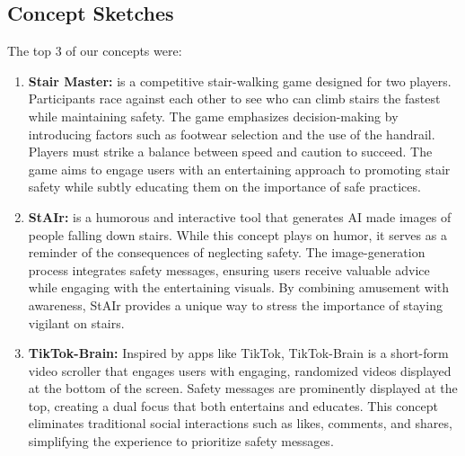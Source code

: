 \documentclass{article}
\begin{document}
\subsection{Concept Sketches}
The top 3 of our concepts were:

\begin{enumerate}
    \item \textbf{Stair Master:}
        is a competitive stair-walking game designed for two players.
        Participants race against each other to see who can climb stairs the fastest while maintaining safety.
        The game emphasizes decision-making by introducing factors such as footwear selection and the use of the handrail.
        Players must strike a balance between speed and caution to succeed.
        The game aims to engage users with an entertaining approach to promoting stair safety
        while subtly educating them on the importance of safe practices.
    \item \textbf{StAIr:}
        is a humorous and interactive tool that generates AI made images of people falling down stairs.
        While this concept plays on humor, it serves as a reminder of the consequences of neglecting safety.
        The image-generation process integrates safety messages,
        ensuring users receive valuable advice while engaging with the entertaining visuals.
        By combining amusement with awareness, StAIr provides a unique way to stress the importance of staying vigilant on stairs.
    \item \textbf{TikTok-Brain:}
        Inspired by apps like TikTok,
        TikTok-Brain is a short-form video scroller that engages users with engaging,
        randomized videos displayed at the bottom of the screen.
        Safety messages are prominently displayed at the top, creating a dual focus that both entertains and educates.
        This concept eliminates traditional social interactions such as likes, comments, and shares,
        simplifying the experience to prioritize safety messages.
\end{enumerate}

\pagebreak
\end{document}
